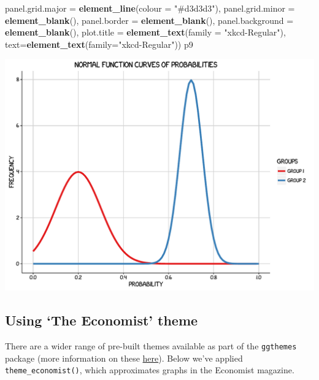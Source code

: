 \documentclass[]{article}
\newenvironment{Shaded}{\begin{snugshade}}{\end{snugshade}}
\newcommand{\KeywordTok}[1]{\textcolor[rgb]{0.13,0.29,0.53}{\textbf{{#1}}}}
\newcommand{\DataTypeTok}[1]{\textcolor[rgb]{0.13,0.29,0.53}{{#1}}}
\newcommand{\StringTok}[1]{\textcolor[rgb]{0.31,0.60,0.02}{{#1}}}
\newcommand{\NormalTok}[1]{{#1}}
\begin{document}
\begin{Shaded}
\begin{Highlighting}[]
            \DataTypeTok{panel.grid.major =} \KeywordTok{element_line}\NormalTok{(}\DataTypeTok{colour =} \StringTok{"#d3d3d3"}\NormalTok{), }
            \DataTypeTok{panel.grid.minor =} \KeywordTok{element_blank}\NormalTok{(), }
            \DataTypeTok{panel.border =} \KeywordTok{element_blank}\NormalTok{(), }\DataTypeTok{panel.background =} \KeywordTok{element_blank}\NormalTok{(),}
            \DataTypeTok{plot.title =} \KeywordTok{element_text}\NormalTok{(}\DataTypeTok{family =} \StringTok{"xkcd-Regular"}\NormalTok{),}
            \DataTypeTok{text=}\KeywordTok{element_text}\NormalTok{(}\DataTypeTok{family=}\StringTok{"xkcd-Regular"}\NormalTok{))}
\NormalTok{p9}
\end{Highlighting}
\end{Shaded}

\begin{center}\includegraphics{0_all_posts_pdf/function_14-1} \end{center}

\subsection{\texorpdfstring{Using `The Economist'
theme}{Using The Economist theme}}\label{using-the-economist-theme-8}

There are a wider range of pre-built themes available as part of the
\texttt{ggthemes} package (more information on these
\href{https://cran.r-project.org/web/packages/ggthemes/vignettes/ggthemes.html}{here}).
Below we've applied \texttt{theme\_economist()}, which approximates
graphs in the Economist magazine.
\end{document}
